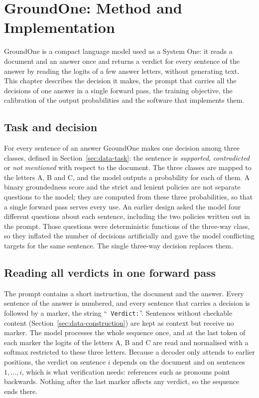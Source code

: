 \chapter{GroundOne: Method and Implementation}
\label{sec:method}


GroundOne is a compact language model used as a System One: it reads a document and an answer once and returns a
verdict for every sentence of the answer by reading the logits of a few answer letters, without generating text. This
chapter describes the decision it makes, the prompt that carries all the decisions of one answer in a single forward
pass, the training objective, the calibration of the output probabilities and the software that implements them.

\section{Task and decision}
\label{sec:method-task}

For every sentence of an answer GroundOne makes one decision among three classes, defined in
Section~\ref{sec:data-task}: the sentence is \emph{supported}, \emph{contradicted} or \emph{not mentioned} with respect
to the document. The three classes are mapped to the letters A, B and C, and the model outputs a probability for each
of them. A binary groundedness score and the strict and lenient policies are not separate questions to the model; they
are computed from these three probabilities, so that a single forward pass serves every use. An earlier design asked
the model four different questions about each sentence, including the two policies written out in the prompt. Those
questions were deterministic functions of the three-way class, so they inflated the number of decisions artificially
and gave the model conflicting targets for the same sentence. The single three-way decision replaces them.

\section{Reading all verdicts in one forward pass}
\label{sec:method-readout}

The prompt contains a short instruction, the document and the answer. Every sentence of the answer is numbered, and
every sentence that carries a decision is followed by a marker, the string ``\texttt{~Verdict:}''. Sentences without
checkable content (Section~\ref{sec:data-construction}) are kept as context but receive no marker. The model processes
the whole sequence once, and at the last token of each marker the logits of the letters A, B and C are read and
normalised with a softmax restricted to these three letters. Because a decoder only attends to earlier positions, the
verdict on sentence $i$ depends on the document and on sentences $1, \dots, i$, which is what verification needs:
references such as pronouns point backwards. Nothing after the last marker affects any verdict, so the sequence ends
there.

